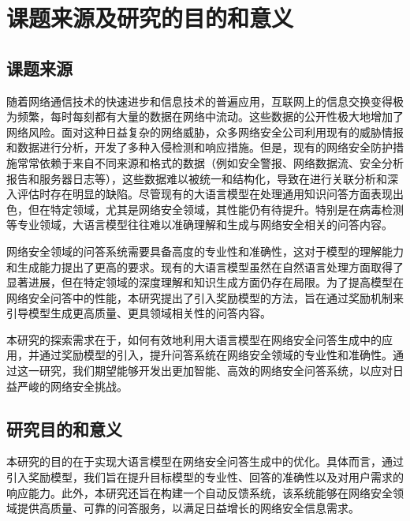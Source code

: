 \section{课题来源及研究的目的和意义}
\subsection{课题来源}
随着网络通信技术的快速进步和信息技术的普遍应用，互联网上的信息交换变得极为频繁，每时每刻都有大量的数据在网络中流动。这些数据的公开性极大地增加了网络风险。面对这种日益复杂的网络威胁，众多网络安全公司利用现有的威胁情报和数据进行分析，开发了多种入侵检测和响应措施。但是，现有的网络安全防护措施常常依赖于来自不同来源和格式的数据（例如安全警报、网络数据流、安全分析报告和服务器日志等），这些数据难以被统一和结构化，导致在进行关联分析和深入评估时存在明显的缺陷。尽管现有的大语言模型在处理通用知识问答方面表现出色，但在特定领域，尤其是网络安全领域，其性能仍有待提升。特别是在病毒检测等专业领域，大语言模型往往难以准确理解和生成与网络安全相关的问答内容。

网络安全领域的问答系统需要具备高度的专业性和准确性，这对于模型的理解能力和生成能力提出了更高的要求。现有的大语言模型虽然在自然语言处理方面取得了显著进展，但在特定领域的深度理解和知识生成方面仍存在局限。为了提高模型在网络安全问答中的性能，本研究提出了引入奖励模型的方法，旨在通过奖励机制来引导模型生成更高质量、更具领域相关性的问答内容。

本研究的探索需求在于，如何有效地利用大语言模型在网络安全问答生成中的应用，并通过奖励模型的引入，提升问答系统在网络安全领域的专业性和准确性。通过这一研究，我们期望能够开发出更加智能、高效的网络安全问答系统，以应对日益严峻的网络安全挑战。
\subsection{研究目的和意义}
本研究的目的在于实现大语言模型在网络安全问答生成中的优化。具体而言，通过引入奖励模型，我们旨在提升目标模型的专业性、回答的准确性以及对用户需求的响应能力。此外，本研究还旨在构建一个自动反馈系统，该系统能够在网络安全领域提供高质量、可靠的问答服务，以满足日益增长的网络安全信息需求。

